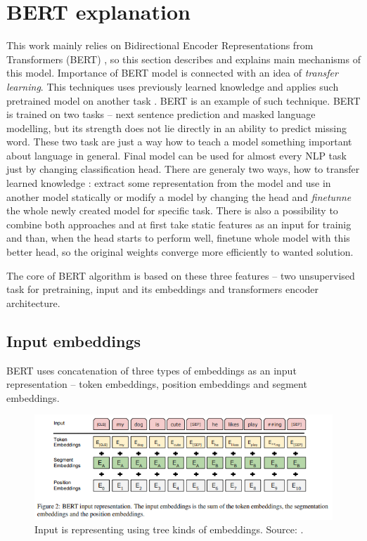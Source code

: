 \section{BERT explanation}
\label{sec:bert}
This work mainly relies on Bidirectional Encoder Representations from Transformers (BERT) \citep{Devlin2019}, so this section describes and explains main mechanisms of this model. Importance of BERT model is connected with an idea of \textit{transfer learning}. This techniques uses previously learned knowledge and applies such pretrained model on another task \citep{Feijo2020}. BERT is an example of such technique. BERT is trained on two tasks -- next sentence prediction and masked language modelling, but its strength does not lie directly in an ability to predict missing word. These two task are just a way how to teach a model something important about language in general. Final model can be used for almost every NLP task just by changing classification head. There are generaly two ways, how to transfer learned knowledge \citep{Feijo2020}: extract some representation from the model and use in another model statically or modify a model by changing the head and \textit{finetunne} the whole newly created model for specific task. There is also a possibility to combine both approaches and at first take static features as an input for trainig and than, when the head starts to perform well, finetune whole model with this better head, so the original weights converge more efficiently to wanted solution.


The core of BERT algorithm is based on these three features -- two unsupervised task for pretraining, input and its embeddings and transformers encoder architecture. %

\subsection{Input embeddings}
BERT uses concatenation of three types of embeddings as an input representation -- token embeddings, position embeddings and segment embeddings. %

\begin{figure}[h]
\centering
\includegraphics[width=1\columnwidth]{../img/bert_embeddings}
\protect\caption{ Input is representing using tree kinds of embeddings.
Source: \textit{\citep{Devlin2019}}.}
\label{pic:bert_emb}
\end{figure}

